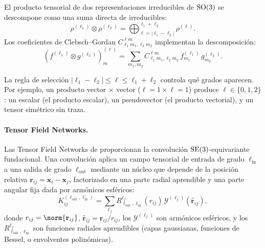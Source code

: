 \begin{theorem}
\label{thm:groups:clebsch-gordan}
El producto tensorial de dos representaciones irreducibles de $\operatorname{SO}(3)$ se
descompone como una suma directa de irreducibles:
\begin{equation}
  \rho^{(\ell_1)} \otimes \rho^{(\ell_2)}
  = \bigoplus_{\ell = |\ell_1 - \ell_2|}^{\ell_1 + \ell_2} \rho^{(\ell)}.
\end{equation}
Los coeficientes de Clebsch--Gordan $C^{\ell m}_{\ell_1 m_1, \ell_2 m_2}$
implementan la descomposici\'on:
\begin{equation}
  (f^{(\ell_1)} \otimes g^{(\ell_2)})^{(\ell)}_m
  = \sum_{m_1, m_2} C^{\ell m}_{\ell_1 m_1, \ell_2 m_2}\,
    f^{(\ell_1)}_{m_1}\, g^{(\ell_2)}_{m_2}.
\end{equation}
\end{theorem}

La regla de selecci\'on $|\ell_1 - \ell_2| \leq \ell \leq \ell_1 + \ell_2$
controla qu\'e grados aparecen. Por ejemplo, un producto vector $\times$ vector
($\ell = 1 \times \ell = 1$) produce $\ell \in \{0, 1, 2\}$: un escalar (el
producto escalar), un pseudovector (el producto vectorial), y un tensor
sim\'etrico sin traza.

\paragraph{Tensor Field Networks.}
Las Tensor Field Networks de \citet{thomas2018tensorfieldnetworks} proporcionan
la convoluci\'on $\operatorname{SE}(3)$-equivariante fundacional. Una convoluci\'on aplica un
campo tensorial de entrada de grado $\ell_{\text{in}}$ a una salida de grado
$\ell_{\text{out}}$ mediante un n\'ucleo que depende de la posici\'on relativa
$\mathbf{r}_{ij} = \mathbf{x}_i - \mathbf{x}_j$, factorizado en una parte radial
aprendible y una parte angular fija dada por arm\'onicos esf\'ericos:
\begin{equation}
  K^{(\ell_{\text{out}}, \ell_{\text{in}})}_{ij}
  = \sum_{\ell_f} R^{\ell_f}_{\ell_{\text{out}}, \ell_{\text{in}}}(r_{ij})\,
    \mathcal{Y}^{(\ell_f)}(\hat{\mathbf{r}}_{ij}),
  \label{eq:groups:tfn-kernel}
\end{equation}
donde $r_{ij} = \norm{\mathbf{r}_{ij}}$, $\hat{\mathbf{r}}_{ij} =
\mathbf{r}_{ij}/r_{ij}$, los $\mathcal{Y}^{(\ell_f)}$ son arm\'onicos
esf\'ericos, y los $R^{\ell_f}_{\ell_{\text{out}}, \ell_{\text{in}}}$ son
funciones radiales aprendibles (capas gaussianas, funciones de Bessel, o
envolventes polin\'omicas).

